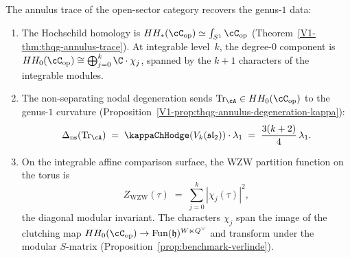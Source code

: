 \begin{proposition}
\label{prop:benchmark-annulus-partition}
The annulus trace of the open-sector category recovers the
genus-$1$ data:
\begin{enumerate}[label=\textup{(\roman*)}]
\item The Hochschild homology is
 $HH_*(\cC_{\mathrm{op}}) \simeq
 \int_{S^1} \cC_{\mathrm{op}}$
 \textup{(}Theorem~\textup{\ref*{V1-thm:thqg-annulus-trace}}\textup{)}.
 At integrable level~$k$, the degree-$0$ component is
 $HH_0(\cC_{\mathrm{op}}) \cong
 \bigoplus_{j=0}^k \C \cdot \chi_j$,
 spanned by the $k + 1$ characters of the integrable modules.

\item The non-separating nodal degeneration sends
 $\mathrm{Tr}_\cA \in HH_0(\cC_{\mathrm{op}})$ to the
 genus-$1$ curvature
 \textup{(}Proposition~\textup{\ref*{V1-prop:thqg-annulus-degeneration-kappa}}\textup{)}:
 \begin{equation}\label{eq:benchmark-annulus-kappa}
 \Delta_{\mathrm{ns}}(\mathrm{Tr}_\cA)
 \;=\;
 \kappaChHodge(V_k(\mathfrak{sl}_2)) \cdot \lambda_1
 \;=\;
 \frac{3(k+2)}{4}\, \lambda_1.
 \end{equation}

\item On the integrable affine comparison surface, the WZW partition
 function on the torus is
 \begin{equation}\label{eq:benchmark-wzw-partition}
 Z_{\mathrm{WZW}}(\tau)
 \;=\;
 \sum_{j=0}^{k}
 |\chi_j(\tau)|^2,
 \end{equation}
 the diagonal modular invariant. The characters $\chi_j$
 span the image of the clutching map
 $HH_0(\cC_{\mathrm{op}}) \to
 \mathrm{Fun}(\mathfrak{h})^{W \ltimes Q^\vee}$
 and transform under the modular $S$-matrix
 \textup{(}Proposition~\textup{\ref{prop:benchmark-verlinde}}\textup{)}.
\end{enumerate}
\end{proposition}


